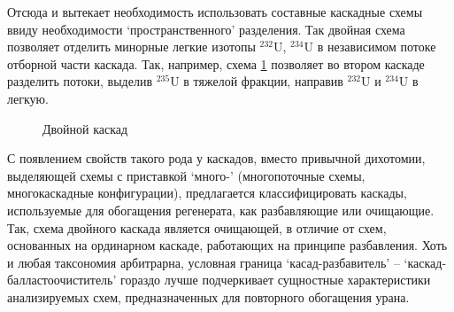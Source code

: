 Отсюда и вытекает необходимость использовать составные каскадные схемы ввиду необходимости  `пространственного' разделения. Так двойная схема позволяет отделить минорные легкие изотопы $^{232}$U, $^{234}$U в независимом потоке отборной части каскада. Так, например, схема \ref{fig:double} позволяет во втором каскаде разделить потоки, выделив $^{235}$U в тяжелой фракции, направив $^{232}$U и $^{234}$U в легкую.

\begin{figure}[ht]
  \caption{Двойной каскад}\label{fig:double}
\end{figure}

С появлением свойств такого рода у каскадов, вместо привычной дихотомии, выделяющей схемы с приставкой `много-' (многопоточные схемы, многокаскадные конфигурации), предлагается классифицировать каскады, используемые для обогащения регенерата, как разбавляющие или очищающие. Так, схема двойного каскада является очищающей, в отличие от схем, основанных на ординарном каскаде, работающих на принципе разбавления.  Хоть и любая таксономия арбитрарна, условная граница `касад-разбавитель' -- `каскад-балластоочиститель' гораздо лучше подчеркивает сущностные характеристики анализируемых схем, предназначенных для повторного обогащения урана.

